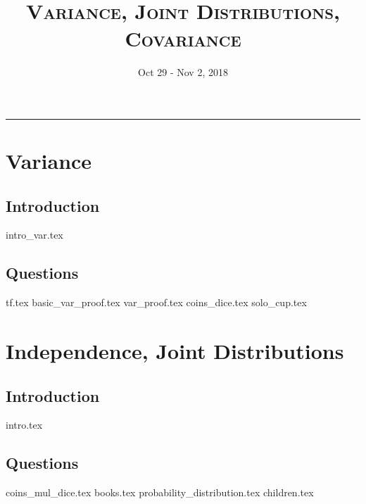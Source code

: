 \documentclass{exam}
\title{\textsc{Variance, Joint Distributions, Covariance}}
\date{Oct 29 - Nov 2, 2018}
\begin{document}
\maketitle
\rule{\textwidth}{0.15em}
\fontsize{12}{15}\selectfont
\thispagestyle{empty}


\section{Variance}
\subsection{Introduction}
{intro_var.tex}
\subsection{Questions}
\begin{questions}
{tf.tex}
{basic_var_proof.tex}
{var_proof.tex}
{coins_dice.tex}
{solo_cup.tex}
\end {questions}

\section{Independence, Joint Distributions}
\subsection{Introduction}
{intro.tex}
\subsection{Questions}
\begin{questions}
{coins_mul_dice.tex}
{books.tex}
{probability_distribution.tex}
{children.tex}
\end{questions}
\end{document}
